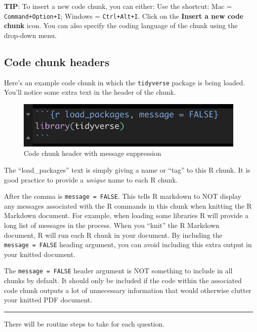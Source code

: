 \documentclass[
]{book}
\begin{document}
\textbf{TIP}: To insert a new code chunk, you can either: Use the shortcut: Mac = \texttt{Command+Option+I}; Windows = \texttt{Ctrl+Alt+I}. Click on the \textbf{Insert a new code chunk} icon. You can also specify the coding language of the chunk using the drop-down menu.

\subsection{Code chunk headers}\label{chunk_headers}

Here's an example code chunk in which the \texttt{tidyverse} package is being loaded. You'll notice some extra text in the header of the chunk.

\begin{figure}
\includegraphics[width=10.56in]{./more/install_package_header2} \caption{Code chunk header with message suppression}\label{fig:unnamed-chunk-12}
\end{figure}

The ``load\_packages'' text is simply giving a name or ``tag'' to this R chunk. It is good practice to provide a \emph{unique} name to each R chunk.

After the comma is \texttt{message\ =\ FALSE}. This tells R markdown to NOT display any messages associated with the R commands in this chunk when knitting the R Markdown document. For example, when loading some libraries R will provide a long list of messages in the process. When you ``knit'' the R Markdown document, R will run each R chunk in your document. By including the \texttt{message\ =\ FALSE} heading argument, you can avoid including this extra output in your knitted document.

The \texttt{message\ =\ FALSE} header argument is NOT something to include in all chunks by default. It should only be included if the code within the associated code chunk outputs a lot of unnecessary information that would otherwise clutter your knitted PDF document.

\begin{center}\rule{0.5\linewidth}{0.5pt}\end{center}

There will be routine steps to take for each question.
\end{document}
